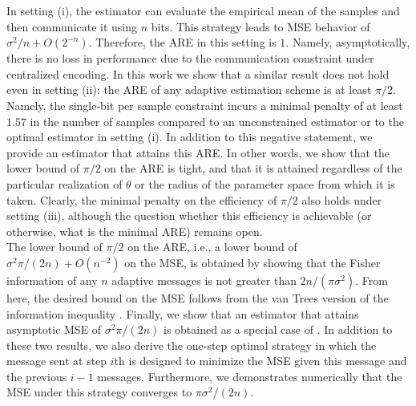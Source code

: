 \documentclass[letterpaper, conference]{IEEEtran}      %
\begin{document}
In setting (i), the estimator can evaluate the empirical mean of the samples and then communicate it using $n$ bits. This strategy leads to MSE behavior of $\sigma^2/n + O(2^{-n})$. Therefore, the ARE in this setting is $1$. Namely, asymptotically, there is no loss in performance due to the communication constraint under centralized encoding. In this work we show that a similar result does not hold even in setting (ii): the ARE of any adaptive estimation scheme is at least $\pi/2$. Namely, the single-bit per sample constraint incurs a minimal penalty of at least $1.57$ in the number of samples compared to an unconstrained estimator or to the optimal estimator in setting (i). In addition to this negative statement, we provide an estimator that attains this ARE. In other words, we show that the lower bound of $\pi/2$ on the ARE is tight, and that it is attained regardless of the particular realization of $\theta$ or the radius of the parameter space from which it is taken. Clearly, the minimal penalty on the efficiency of $\pi/2$ also holds under setting (iii), although the question whether this efficiency is achievable (or otherwise, what is the minimal ARE) remains open. 
\\

The lower bound of $\pi/2$ on the ARE, i.e., a lower bound of $\sigma^2\pi/(2n) +O(n^{-2})$ on the MSE, is obtained by showing that the Fisher information of any $n$ adaptive messages is not greater than $2n/(\pi \sigma^2)$. From here, the desired bound on the MSE follows from the van Trees version of the information inequality \cite{gill1995applications}. Finally, we show that an estimator that attains asymptotic MSE of $\sigma^2\pi/(2n)$ is obtained as a special case of \cite[Thm. 4]{polyak1992acceleration}. In addition to these two results, we also derive the one-step optimal strategy in which the message sent at step $i$th is designed to minimize the MSE given this message and the previous $i-1$ messages. Furthermore, we demonstrates numerically that the MSE under this strategy converges to $\pi \sigma^2/(2n)$.\\
\end{document}
